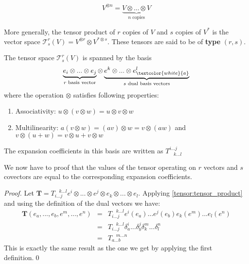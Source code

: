    \begin{notation}
    	\begin{equation}
    		V^{\otimes n} = \underbrace{V\otimes...\otimes V}_{n\text{ copies}}
    	\end{equation}
    \end{notation}
    \begin{remark}
    	More generally, the tensor product of $r$ copies of $V$ and $s$ copies of $V^*$ is the vector space $\mathcal{T}^r_s(V) = V^{\otimes r}\otimes V^{*\otimes s}$. These tensors are said to be of \textbf{type} $(r, s)$.
    \end{remark}

    \begin{definition}
    	\label{tensor:type}
    	The tensor space $\mathcal{T}^r_s(V)$ is spanned by the basis \[\underbrace{e_i\otimes...\otimes e_j}_{r\text{ basis vector}}\otimes\underbrace{e^k\otimes...\otimes e^l_{\textcolor{white}{a}}}_{s\text{ dual basis vectors}}\] where the operation $\otimes$ satisfies following properties:
        \begin{enumerate}
        	\item Associativity: $u\otimes(v\otimes w) = u \otimes v\otimes w$
            \item Multilinearity: $a(v\otimes w) = (av)\otimes w = v\otimes (aw)$ and $v\otimes (u+w) = v\otimes u + v\otimes w$
        \end{enumerate}
        The expansion coefficients in this basis are written as $T^{i...j}_{\ \ \ \ k...l}$
    \end{definition}
    
    \begin{theorem}
    	We now have to proof that the values of the tensor operating on $r$ vectors and $s$ covectors are equal to the corresponding expansion coefficients.
      	\begin{proof}
        	Let $\mathbf{T} = T_{i...j}^{\ \ \ \ k...l}e^i\otimes...\otimes e^j\otimes e_k\otimes...\otimes e_l$. Applying \ref{tensor:tensor_product} and using the definition of the dual vectors we have:
            \[
            \begin{array}{ccl}
            	\mathbf{T}(e_a, ..., e_b, e^m, ..., e^n) &=& T_{i...j}^{\ \ \ \ k...l}e^i(e_a)...e^j(e_b)e_k(e^m)...e_l(e^n)\\
                &=& T_{i...j}^{\ \ \ \ k...l}\delta_a^i...\delta_b^j\delta_k^m...\delta_l^n\\
                &=& T_{a...b}^{\ \ \ \ m...n}
            \end{array}
			\]
            This is exactly the same result as the one we get by applying the first definition.\qed
      	\end{proof}
    \end{theorem}
    

